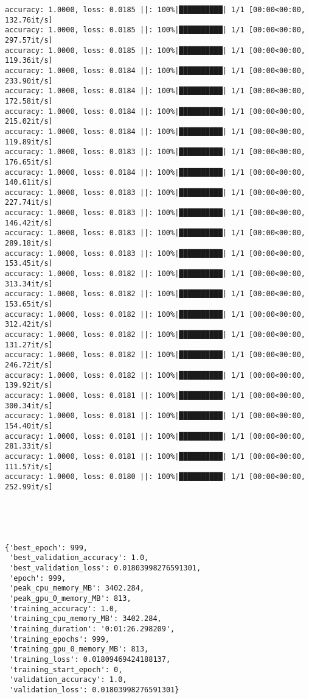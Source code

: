 \documentclass[
]{article}
\begin{document}
\begin{verbatim}
accuracy: 1.0000, loss: 0.0185 ||: 100%|██████████| 1/1 [00:00<00:00, 132.76it/s]
accuracy: 1.0000, loss: 0.0185 ||: 100%|██████████| 1/1 [00:00<00:00, 297.57it/s]
accuracy: 1.0000, loss: 0.0185 ||: 100%|██████████| 1/1 [00:00<00:00, 119.36it/s]
accuracy: 1.0000, loss: 0.0184 ||: 100%|██████████| 1/1 [00:00<00:00, 233.90it/s]
accuracy: 1.0000, loss: 0.0184 ||: 100%|██████████| 1/1 [00:00<00:00, 172.58it/s]
accuracy: 1.0000, loss: 0.0184 ||: 100%|██████████| 1/1 [00:00<00:00, 215.02it/s]
accuracy: 1.0000, loss: 0.0184 ||: 100%|██████████| 1/1 [00:00<00:00, 119.89it/s]
accuracy: 1.0000, loss: 0.0183 ||: 100%|██████████| 1/1 [00:00<00:00, 176.65it/s]
accuracy: 1.0000, loss: 0.0184 ||: 100%|██████████| 1/1 [00:00<00:00, 140.61it/s]
accuracy: 1.0000, loss: 0.0183 ||: 100%|██████████| 1/1 [00:00<00:00, 227.74it/s]
accuracy: 1.0000, loss: 0.0183 ||: 100%|██████████| 1/1 [00:00<00:00, 146.42it/s]
accuracy: 1.0000, loss: 0.0183 ||: 100%|██████████| 1/1 [00:00<00:00, 289.18it/s]
accuracy: 1.0000, loss: 0.0183 ||: 100%|██████████| 1/1 [00:00<00:00, 153.45it/s]
accuracy: 1.0000, loss: 0.0182 ||: 100%|██████████| 1/1 [00:00<00:00, 313.34it/s]
accuracy: 1.0000, loss: 0.0182 ||: 100%|██████████| 1/1 [00:00<00:00, 153.65it/s]
accuracy: 1.0000, loss: 0.0182 ||: 100%|██████████| 1/1 [00:00<00:00, 312.42it/s]
accuracy: 1.0000, loss: 0.0182 ||: 100%|██████████| 1/1 [00:00<00:00, 131.27it/s]
accuracy: 1.0000, loss: 0.0182 ||: 100%|██████████| 1/1 [00:00<00:00, 246.72it/s]
accuracy: 1.0000, loss: 0.0182 ||: 100%|██████████| 1/1 [00:00<00:00, 139.92it/s]
accuracy: 1.0000, loss: 0.0181 ||: 100%|██████████| 1/1 [00:00<00:00, 300.34it/s]
accuracy: 1.0000, loss: 0.0181 ||: 100%|██████████| 1/1 [00:00<00:00, 154.40it/s]
accuracy: 1.0000, loss: 0.0181 ||: 100%|██████████| 1/1 [00:00<00:00, 281.33it/s]
accuracy: 1.0000, loss: 0.0181 ||: 100%|██████████| 1/1 [00:00<00:00, 111.57it/s]
accuracy: 1.0000, loss: 0.0180 ||: 100%|██████████| 1/1 [00:00<00:00, 252.99it/s]





{'best_epoch': 999,
 'best_validation_accuracy': 1.0,
 'best_validation_loss': 0.01803998276591301,
 'epoch': 999,
 'peak_cpu_memory_MB': 3402.284,
 'peak_gpu_0_memory_MB': 813,
 'training_accuracy': 1.0,
 'training_cpu_memory_MB': 3402.284,
 'training_duration': '0:01:26.298209',
 'training_epochs': 999,
 'training_gpu_0_memory_MB': 813,
 'training_loss': 0.01809469424188137,
 'training_start_epoch': 0,
 'validation_accuracy': 1.0,
 'validation_loss': 0.01803998276591301}
\end{verbatim}
\end{document}
